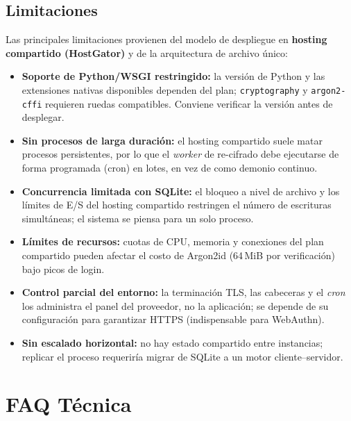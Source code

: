 \documentclass[10pt,letterpaper]{report}
\begin{document}
\section{Limitaciones}
Las principales limitaciones provienen del modelo de despliegue en \textbf{hosting compartido
(HostGator)} y de la arquitectura de archivo \'unico:
\begin{itemize}
  \item \textbf{Soporte de Python/WSGI restringido:} la versi\'on de Python y las extensiones nativas
  disponibles dependen del plan; \texttt{cryptography} y \texttt{argon2-cffi} requieren ruedas
  compatibles. Conviene verificar la versi\'on antes de desplegar.
  \item \textbf{Sin procesos de larga duraci\'on:} el hosting compartido suele matar procesos
  persistentes, por lo que el \emph{worker} de re-cifrado debe ejecutarse de forma programada (cron)
  en lotes, en vez de como demonio continuo.
  \item \textbf{Concurrencia limitada con SQLite:} el bloqueo a nivel de archivo y los l\'imites de
  E/S del hosting compartido restringen el n\'umero de escrituras simult\'aneas; el sistema se piensa
  para un solo proceso.
  \item \textbf{L\'imites de recursos:} cuotas de CPU, memoria y conexiones del plan compartido pueden
  afectar el costo de Argon2id (64\,MiB por verificaci\'on) bajo picos de login.
  \item \textbf{Control parcial del entorno:} la terminaci\'on TLS, las cabeceras y el \emph{cron} los
  administra el panel del proveedor, no la aplicaci\'on; se depende de su configuraci\'on para
  garantizar HTTPS (indispensable para WebAuthn).
  \item \textbf{Sin escalado horizontal:} no hay estado compartido entre instancias; replicar el
  proceso requerir\'ia migrar de SQLite a un motor cliente--servidor.
\end{itemize}

\chapter{FAQ T\'ecnica}
\end{document}
